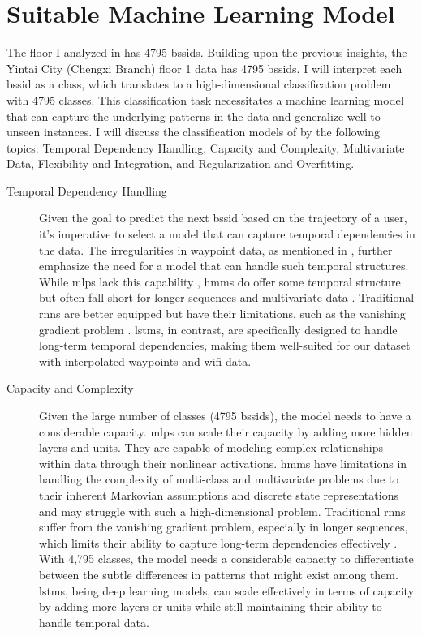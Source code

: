 \chapter{Suitable Machine Learning Model}\label{ch:discuss-ml}

The floor I analyzed in  has 4795 \acp{bssid}.
Building upon the previous insights, the Yintai City (Chengxi Branch) floor 1 data has 4795 \acp{bssid}.
I will interpret each \ac{bssid} as a class, which translates to a high-dimensional classification problem with 4795 classes.
This classification task necessitates a machine learning model that can capture the underlying patterns in the data and generalize well to unseen instances.
I will discuss the classification models of  by the following topics: Temporal Dependency Handling, Capacity and Complexity, Multivariate Data, Flexibility and Integration, and Regularization and Overfitting. \\

\begin{description}
\item[Temporal Dependency Handling]
Given the goal to predict the next \ac{bssid} based on the trajectory of a user, it's imperative to select a model that can capture temporal dependencies in the data.
The irregularities in waypoint data, as mentioned in , further emphasize the need for a model that can handle such temporal structures.
While \acp{mlp} lack this capability \cite{mlp_and_nn}, \acp{hmm} do offer some temporal structure but often fall short for longer sequences and multivariate data \cite{hmm-rabiner-1989}.
Traditional \acp{rnn} are better equipped but have their limitations, such as the vanishing gradient problem \cite{rnn_difficulties_2013}.
\acp{lstm}, in contrast, are specifically designed to handle long-term temporal dependencies, making them well-suited for our dataset with interpolated waypoints and \ac{wifi} data.
\end{description}

\begin{description}
\item[Capacity and Complexity]
Given the large number of classes (4795 \acp{bssid}), the model needs to have a considerable capacity.
\acp{mlp} can scale their capacity by adding more hidden layers and units.
They are capable of modeling complex relationships within data through their nonlinear activations.
\acp{hmm} have limitations in handling the complexity of multi-class and multivariate problems due to their inherent Markovian assumptions and discrete state representations and may struggle with such a high-dimensional problem.
Traditional \acp{rnn} suffer from the vanishing gradient problem, especially in longer sequences, which limits their ability to capture long-term dependencies effectively \cite{rnn_difficulties_2013}.
With 4,795 classes, the model needs a considerable capacity to differentiate between the subtle differences in patterns that might exist among them. 
\acp{lstm}, being deep learning models, can scale effectively in terms of capacity by adding more layers or units while still maintaining their ability to handle temporal data.
\end{description}

